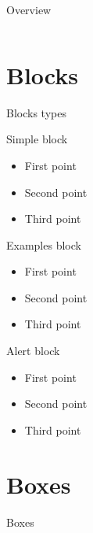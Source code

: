 \documentclass{IFES-beamer}
\begin{document}
\begin{frame}{Overview}
\begin{columns}
\begin{column}{0.5\textwidth}
\end{column}

\end{columns}
\end{frame}

\section{Blocks}
\begin{frame}{Blocks types}

\begin{block}{Simple block}
\begin{itemize}
\item First point
\item Second point
\item Third point
\end{itemize}
\end{block}

\begin{exampleblock}{Examples block}
\begin{itemize}
\item First point
\item Second point
\item Third point
\end{itemize}
\end{exampleblock}

\begin{alertblock}{Alert block}
\begin{itemize}
\item First point
\item Second point
\item Third point
\end{itemize}
\end{alertblock}
\end{frame}

\section{Boxes}

\begin{frame}{Boxes}









\end{frame}
\end{document}
